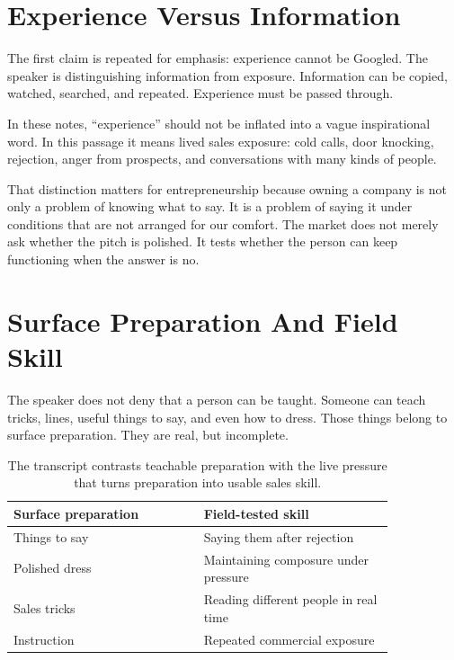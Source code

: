 \section{Experience Versus Information}

The first claim is repeated for emphasis: experience cannot be Googled. The speaker is distinguishing information from exposure. Information can be copied, watched, searched, and repeated. Experience must be passed through.

\begin{remark}
In these notes, ``experience'' should not be inflated into a vague inspirational word. In this passage it means lived sales exposure: cold calls, door knocking, rejection, anger from prospects, and conversations with many kinds of people.
\end{remark}

That distinction matters for entrepreneurship because owning a company is not only a problem of knowing what to say. It is a problem of saying it under conditions that are not arranged for our comfort. The market does not merely ask whether the pitch is polished. It tests whether the person can keep functioning when the answer is no.

\section{Surface Preparation And Field Skill}

The speaker does not deny that a person can be taught. Someone can teach tricks, lines, useful things to say, and even how to dress. Those things belong to surface preparation. They are real, but incomplete.

\begin{table}
\centering
\begin{tabular}{p{0.42\linewidth}p{0.42\linewidth}}
\hline
Surface preparation & Field-tested skill \\
\hline
Things to say & Saying them after rejection \\
Polished dress & Maintaining composure under pressure \\
Sales tricks & Reading different people in real time \\
Instruction & Repeated commercial exposure \\
\hline
\end{tabular}
\caption{The transcript contrasts teachable preparation with the live pressure that turns preparation into usable sales skill.}
\end{table}

